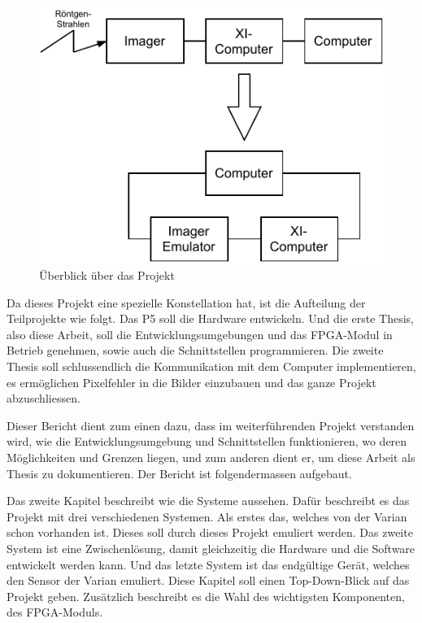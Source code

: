 \documentclass{article}
\begin{document}
\begin{figure}[tb]
    \includegraphics[width=\linewidth]{drawio/bd_sehr_grob}
    \caption{Überblick über das Projekt}
    \label{fig:bd_sehr_grob}
\end{figure}

Da dieses Projekt eine spezielle Konstellation hat, ist die Aufteilung der Teilprojekte wie folgt. Das P5 soll die Hardware entwickeln. Und die erste Thesis, also diese Arbeit, soll die Entwicklungsumgebungen und das FPGA-Modul in Betrieb genehmen, sowie auch die Schnittstellen programmieren. Die zweite Thesis soll schlussendlich die Kommunikation mit dem Computer implementieren, es ermöglichen Pixelfehler in die Bilder einzubauen und das ganze Projekt abzuschliessen.

Dieser Bericht dient zum einen dazu, dass im weiterführenden Projekt verstanden wird, wie die Entwicklungsumgebung und Schnittstellen funktionieren, wo deren Möglichkeiten und Grenzen liegen, und zum anderen dient er, um diese Arbeit als Thesis zu dokumentieren. Der Bericht ist folgendermassen aufgebaut.

Das zweite Kapitel beschreibt wie die Systeme aussehen. Dafür beschreibt es das Projekt mit drei verschiedenen Systemen. Als erstes das, welches von der Varian schon vorhanden ist. Dieses soll durch dieses Projekt emuliert werden. Das zweite System ist eine Zwischenlösung, damit gleichzeitig die Hardware und die Software entwickelt werden kann. Und das letzte System ist das endgültige Gerät, welches den Sensor der Varian emuliert. Diese Kapitel soll einen Top-Down-Blick auf das Projekt geben. Zusätzlich beschreibt es die Wahl des wichtigsten Komponenten, des FPGA-Moduls.
\end{document}
